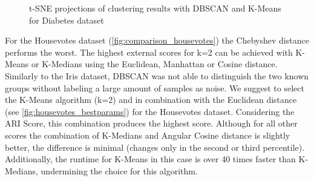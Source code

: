 \begin{figure}[H]
	\centering
	\caption{t-SNE projections of clustering results with DBSCAN and K-Means for Diabetes dataset}
	\label{fig:diabetestsne}
\end{figure}

For the Housevotes dataset (\autoref{fig:comparison_housevotes}) the Chebyshev distance performs the worst. The highest external scores for k=2 can be achieved with K-Means or K-Medians using the Euclidean, Manhattan or Cosine distance. Similarly to the Iris dataset, DBSCAN was not able to distinguish the two known groups without labeling a large amount of samples as noise. We suggest to select the K-Means algorithm (k=2) and in combination with the Euclidean distance (see \autoref{fig:housevotes_bestparams}) for the Housevotes dataset. Considering the ARI Score, this combination produces the highest score. Although for all other scores the combination of K-Medians and Angular Cosine distance is slightly better, the difference is minimal (changes only in the second or third percentile). Additionally, the runtime for K-Means in this case is over 40 times faster than K-Medians, undermining the choice for this algorithm.

